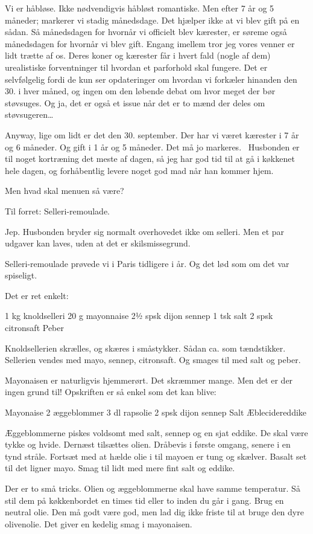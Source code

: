 \documentclass[
]{book}
\begin{document}
Vi er håbløse. Ikke nødvendigvis håbløst romantiske. Men efter 7 år og 5 måneder; markerer vi stadig månedsdage. Det hjælper ikke at vi blev gift på en sådan. Så månedsdagen for hvornår vi officielt blev kærester, er søreme også månedsdagen for hvornår vi blev gift. Engang imellem tror jeg vores venner er lidt trætte af os. Deres koner og kærester får i hvert fald (nogle af dem) urealistiske forventninger til hvordan et parforhold skal fungere. Det er selvfølgelig fordi de kun ser opdateringer om hvordan vi forkæler hinanden den 30. i hver måned, og ingen om den løbende debat om hvor meget der bør støvsuges. Og ja, det er også et issue når det er to mænd der deles om støvsugeren\ldots{}

Anyway, lige om lidt er det den 30. september. Der har vi været kærester i 7 år og 6 måneder. Og gift i 1 år og 5 måneder. Det må jo markeres. ~Husbonden er til noget kortræning det meste af dagen, så jeg har god tid til at gå i køkkenet hele dagen, og forhåbentlig levere noget god mad når han kommer hjem.

Men hvad skal menuen så være?

Til forret:
Selleri-remoulade.

Jep. Husbonden bryder sig normalt overhovedet ikke om selleri. Men et par udgaver kan laves, uden at det er skilsmissegrund.

Selleri-remoulade prøvede vi i Paris tidligere i år. Og det lød som om det var spiseligt.

Det er ret enkelt:

1 kg knoldselleri
20 g mayonnaise
2½ spsk dijon sennep
1 tsk salt
2 spsk citronsaft
Peber

Knoldsellerien skrælles, og skæres i småstykker. Sådan ca. som tændstikker. Sellerien vendes med mayo, sennep, citronsaft. Og smages til med salt og peber.

Mayonaisen er naturligvis hjemmerørt. Det skræmmer mange. Men det er der ingen grund til! Opskriften er så enkel som det kan blive:

Mayonaise
2 æggeblommer
3 dl rapsolie
2 spsk dijon sennep
Salt
Æblecidereddike

Æggeblommerne piskes voldsomt med salt, sennep og en sjat eddike. De skal være tykke og hvide. Dernæst tilsættes olien. Dråbevis i første omgang, senere i en tynd stråle. Fortsæt med at hælde olie i til mayoen er tung og skælver. Basalt set til det ligner mayo. Smag til lidt med mere fint salt og eddike.

Der er to små tricks. Olien og æggeblommerne skal have samme temperatur. Så stil dem på køkkenbordet en times tid eller to inden du går i gang. Brug en neutral olie. Den må godt være god, men lad dig ikke friste til at bruge den dyre olivenolie. Det giver en kedelig smag i mayonaisen.
\end{document}
